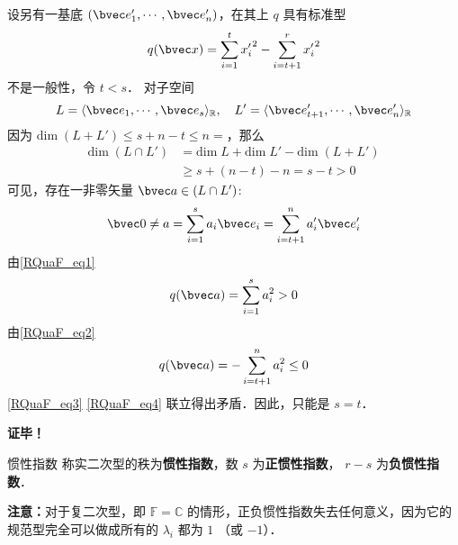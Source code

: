 设另有一基底 $(\bvec e'_1,\cdots,\bvec e'_n)$，在其上 $q$ 具有标准型
\begin{equation}\label{RQuaF_eq2}
q(\bvec x)=\sum_{i=1}^{t}{x'_i}^2-\sum_{i=t+1}^{r} {x'_{i}}^{2}
\end{equation}
不是一般性，令 $t<s$．
对子空间
\begin{equation}
L=\langle \bvec e_1,\cdots,\bvec e_s\rangle_\mathbb{R},\quad L'=\langle \bvec e'_{t+1},\cdots,\bvec e'_n\rangle_\mathbb{R}
\end{equation}
因为 $\mathrm{dim}\;(L+L')\leq s+n-t\leq n=$，那么
\begin{equation}
\begin{aligned}
\mathrm{dim}\;(L\cap L')&=\mathrm{dim}\; L+\mathrm{dim}\; L'-\mathrm{dim}\;(L+L')\\
&\geq s+(n-t)-n=s-t> 0
\end{aligned}
\end{equation}
可见，存在一非零矢量 $\bvec a\in(L\cap L')$:
\begin{equation}
\bvec 0\neq a=\sum_{i=1}^s a_i\bvec e_i=\sum_{i=t+1}^n a'_i \bvec e'_i
\end{equation}
由\autoref{RQuaF_eq1} 
\begin{equation}\label{RQuaF_eq3}
q(\bvec a)=\sum_{i=1}^s a_i^2>0
\end{equation}
由\autoref{RQuaF_eq2} 
\begin{equation}\label{RQuaF_eq4}
q(\bvec a)=-\sum_{i=t+1}^n a_i^2\leq 0
\end{equation}
\autoref{RQuaF_eq3} \autoref{RQuaF_eq4} 联立得出矛盾．因此，只能是 $s=t$．

\textbf{证毕！}
\begin{definition}{惯性指数}
称实二次型的秩为\textbf{惯性指数}，数 $s$ 为\textbf{正惯性指数}， $r-s$ 为\textbf{负惯性指数}．
\end{definition}

\textbf{注意：}对于复二次型，即 $\mathbb F=\mathbb C$ 的情形，正负惯性指数失去任何意义，因为它的规范型完全可以做成所有的 $\lambda_i$ 都为 $1$ （或 $-1$）．